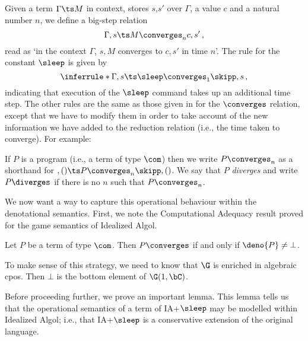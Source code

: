 Given a term $\Gamma\ts M$ in context, stores $s$,$s'$ over $\Gamma$, a value $c$ and a natural number $n$, we define a big-step relation
\[
  \Gamma,s\ts M\converges_n c,s'\,,
  \]
read as `in the context $\Gamma$, $s,M$ converges to $c,s'$ in time $n$'.  
The rule for the constant $\sleep$ is given by
\[
  \inferrule*
  { }
  {\Gamma,s\ts \sleep\converges_1 \skipp,s}\,,
  \]
indicating that execution of the $\sleep$ command takes up an additional time step.  
The other rules are the same as those given in \cite{SamsonGuyIAActive} for the $\converges$ relation, except that we have to modify them in order to take account of the new information we have added to the reduction relation (i.e., the time taken to converge).
For example:
If $P$ is a program (i.e., a term of type $\com$) then we write $P\converges_n$ as a shorthand for $,()\ts P \converges_n \skipp,()$.
We say that $P$ \emph{diverges} and write $P\diverges$ if there is no $n$ such that $P\converges_n$.

We now want a way to capture this operational behaviour within the denotational semantics.
First, we note the Computational Adequacy result proved for the game semantics of Idealized Algol.

\begin{proposition}
  Let $P$ be a term of type $\com$.  
  Then $P\converges$ if and only if $\deno{P}\ne\bot$.
  \label{SamsonGuyAdequacy}
\end{proposition}

To make sense of this strategy, we need to know that $\G$ is enriched in algebraic cpos.  
Then $\bot$ is the bottom element of $\G(1,\bC)$.

Before proceeding further, we prove an important lemma.  
This lemma tells us that the operational semantics of a term of IA+$\sleep$ may be modelled within Idealized Algol; i.e., that IA+$\sleep$ is a conservative extension of the original language.


